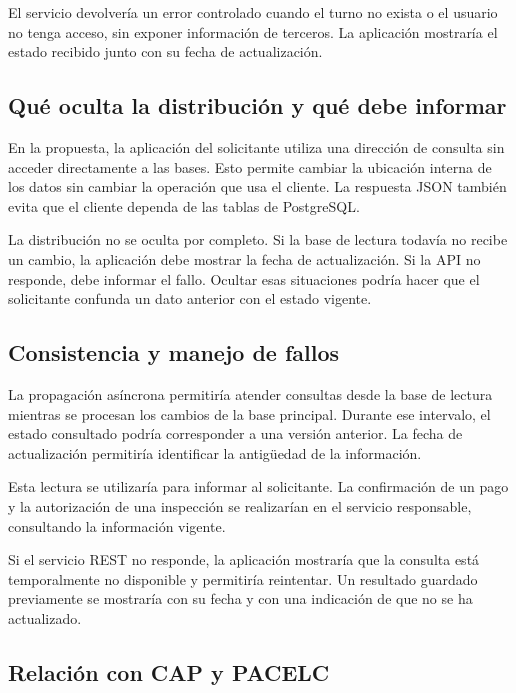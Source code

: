 \documentclass[10pt,a4paper,twocolumn]{article}
\begin{document}
El servicio devolvería un error controlado cuando el turno no exista o el usuario no tenga acceso, sin exponer información de terceros. La aplicación mostraría el estado recibido junto con su fecha de actualización.



\subsection{Qué oculta la distribución y qué debe informar}

En la propuesta, la aplicación del solicitante utiliza una dirección de consulta sin acceder directamente a las bases. Esto permite cambiar la ubicación interna de los datos sin cambiar la operación que usa el cliente. La respuesta JSON también evita que el cliente dependa de las tablas de PostgreSQL.



La distribución no se oculta por completo. Si la base de lectura todavía no recibe un cambio, la aplicación debe mostrar la fecha de actualización. Si la API no responde, debe informar el fallo. Ocultar esas situaciones podría hacer que el solicitante confunda un dato anterior con el estado vigente.



\subsection{Consistencia y manejo de fallos}

La propagación asíncrona permitiría atender consultas desde la base de lectura mientras se procesan los cambios de la base principal. Durante ese intervalo, el estado consultado podría corresponder a una versión anterior. La fecha de actualización permitiría identificar la antigüedad de la información.



Esta lectura se utilizaría para informar al solicitante. La confirmación de un pago y la autorización de una inspección se realizarían en el servicio responsable, consultando la información vigente.



Si el servicio REST no responde, la aplicación mostraría que la consulta está temporalmente no disponible y permitiría reintentar. Un resultado guardado previamente se mostraría con su fecha y con una indicación de que no se ha actualizado.



\subsection{Relación con CAP y PACELC}
\end{document}
